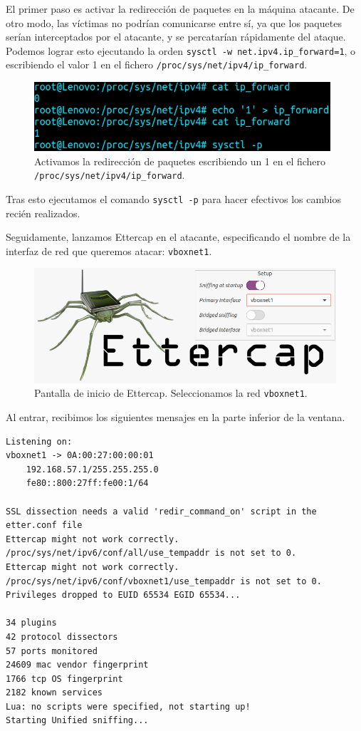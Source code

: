 \documentclass[11pt]{article}
\begin{document}
El primer paso es activar la redirección de paquetes en la máquina atacante. De otro modo, las víctimas no podrían comunicarse entre sí, ya
que los paquetes serían interceptados por el atacante, y se percatarían rápidamente del ataque. Podemos lograr esto ejecutando la orden
\verb|sysctl -w net.ipv4.ip_forward=1|, o escribiendo el valor 1 en el fichero \texttt{/proc/sys/net/ipv4/ip\_forward}.

\begin{figure}[H]
	\centering
	\includegraphics[width=110mm]{images/ip_forward}
	\caption{Activamos la redirección de paquetes escribiendo un 1 en el fichero \texttt{/proc/sys/net/ipv4/ip\_forward}.}
	\label{fig:ip_forward}
\end{figure}

Tras esto ejecutamos el comando \verb|sysctl -p| para hacer efectivos los cambios recién realizados.

Seguidamente, lanzamos Ettercap en el atacante, especificando el nombre de la interfaz de red que queremos atacar: \texttt{vboxnet1}.

\begin{figure}[H]
	\centering
	\includegraphics[width=140mm]{images/ettercap-start}
	\caption{Pantalla de inicio de Ettercap. Seleccionamos la red \texttt{vboxnet1}.}
	\label{fig:ettercap-start}
\end{figure}

Al entrar, recibimos los siguientes mensajes en la parte inferior de la ventana.

\begin{Verbatim}[tabsize=4]
Listening on:
vboxnet1 -> 0A:00:27:00:00:01
	192.168.57.1/255.255.255.0
	fe80::800:27ff:fe00:1/64

SSL dissection needs a valid 'redir_command_on' script in the etter.conf file
Ettercap might not work correctly. /proc/sys/net/ipv6/conf/all/use_tempaddr is not set to 0.
Ettercap might not work correctly. /proc/sys/net/ipv6/conf/vboxnet1/use_tempaddr is not set to 0.
Privileges dropped to EUID 65534 EGID 65534...

34 plugins
42 protocol dissectors
57 ports monitored
24609 mac vendor fingerprint
1766 tcp OS fingerprint
2182 known services
Lua: no scripts were specified, not starting up!
Starting Unified sniffing...
\end{Verbatim}
\end{document}
